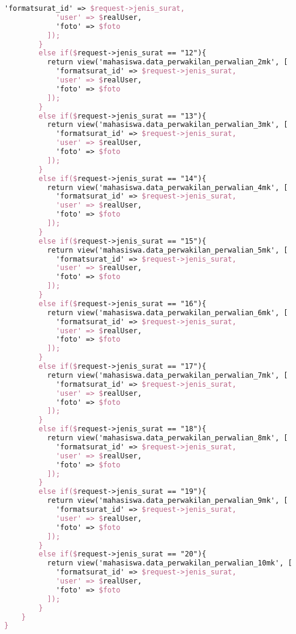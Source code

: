 \begin{lstlisting}[language=tex,basicstyle=\tiny,caption=FormatsuratController.php]
            'formatsurat_id' => $request->jenis_surat,
            'user' => $realUser,
            'foto' => $foto
          ]);
        }
        else if($request->jenis_surat == "12"){
          return view('mahasiswa.data_perwakilan_perwalian_2mk', [
            'formatsurat_id' => $request->jenis_surat,
            'user' => $realUser,
            'foto' => $foto
          ]);
        }
        else if($request->jenis_surat == "13"){
          return view('mahasiswa.data_perwakilan_perwalian_3mk', [
            'formatsurat_id' => $request->jenis_surat,
            'user' => $realUser,
            'foto' => $foto
          ]);
        }
        else if($request->jenis_surat == "14"){
          return view('mahasiswa.data_perwakilan_perwalian_4mk', [
            'formatsurat_id' => $request->jenis_surat,
            'user' => $realUser,
            'foto' => $foto
          ]);
        }
        else if($request->jenis_surat == "15"){
          return view('mahasiswa.data_perwakilan_perwalian_5mk', [
            'formatsurat_id' => $request->jenis_surat,
            'user' => $realUser,
            'foto' => $foto
          ]);
        }
        else if($request->jenis_surat == "16"){
          return view('mahasiswa.data_perwakilan_perwalian_6mk', [
            'formatsurat_id' => $request->jenis_surat,
            'user' => $realUser,
            'foto' => $foto
          ]);
        }
        else if($request->jenis_surat == "17"){
          return view('mahasiswa.data_perwakilan_perwalian_7mk', [
            'formatsurat_id' => $request->jenis_surat,
            'user' => $realUser,
            'foto' => $foto
          ]);
        }
        else if($request->jenis_surat == "18"){
          return view('mahasiswa.data_perwakilan_perwalian_8mk', [
            'formatsurat_id' => $request->jenis_surat,
            'user' => $realUser,
            'foto' => $foto
          ]);
        }
        else if($request->jenis_surat == "19"){
          return view('mahasiswa.data_perwakilan_perwalian_9mk', [
            'formatsurat_id' => $request->jenis_surat,
            'user' => $realUser,
            'foto' => $foto
          ]);
        }
        else if($request->jenis_surat == "20"){
          return view('mahasiswa.data_perwakilan_perwalian_10mk', [
            'formatsurat_id' => $request->jenis_surat,
            'user' => $realUser,
            'foto' => $foto
          ]);
        }
    }
}
\end{lstlisting}

